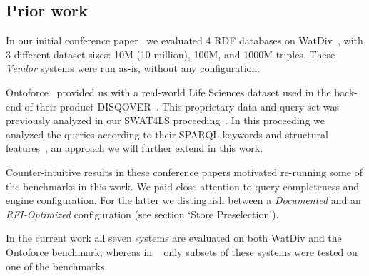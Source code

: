 \documentclass[twocolumn]{bmcart}%
\newcommand\todo[1]{\textcolor{red}{#1}}
\begin{document}

\subsection{Prior work}

In our initial conference paper~\cite{de2016big} we evaluated 4 RDF databases on WatDiv~\cite{alucc2014diversified}, with 3 different dataset sizes: 10M (10 million), 100M, and 1000M triples. These \emph{Vendor} systems were run as-is, without any configuration. 

Ontoforce~\cite{ontoforcewebsite} provided us with a real-world Life \mbox{Sciences} dataset used in the back-end of their product \mbox{DISQOVER~\cite{disqover}}. This proprietary data and query-set was previously analyzed in our SWAT4LS proceeding~\cite{dewitte_swat4ls_2016}.
In this proceeding we analyzed the queries according to their SPARQL keywords and structural features~\cite{DBLP:journals/corr/abs-1103-5043}, an approach we will further extend in this work. 

Counter-intuitive results in these conference papers motivated re-running some of the benchmarks in this work. We paid close attention to query completeness and engine configuration. For the latter we distinguish between a \emph{Documented} and an \emph{RFI-Optimized} configuration (see section `Store Preselection'). 

In the current work all seven systems are evaluated on both WatDiv and the Ontoforce benchmark, whereas in ~\cite{de2016big,dewitte_swat4ls_2016} only subsets of these systems were tested on one of the benchmarks.

\end{document}
